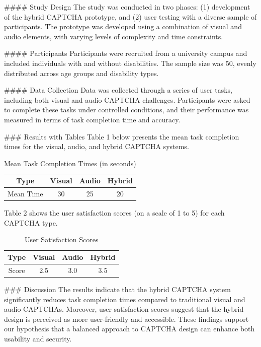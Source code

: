 #### Study Design
The study was conducted in two phases: (1) development of the hybrid CAPTCHA prototype, and (2) user testing with a diverse sample of participants. The prototype was developed using a combination of visual and audio elements, with varying levels of complexity and time constraints.

#### Participants
Participants were recruited from a university campus and included individuals with and without disabilities. The sample size was 50, evenly distributed across age groups and disability types.

#### Data Collection
Data was collected through a series of user tasks, including both visual and audio CAPTCHA challenges. Participants were asked to complete these tasks under controlled conditions, and their performance was measured in terms of task completion time and accuracy.

### Results with Tables
Table 1 below presents the mean task completion times for the visual, audio, and hybrid CAPTCHA systems.

\begin{table}[ht]
\centering
\caption{Mean Task Completion Times (in seconds)}
\label{tab:completion_times}
\begin{tabular}{|c|c|c|c|}
\hline
\textbf{Type} & \textbf{Visual} & \textbf{Audio} & \textbf{Hybrid} \\
\hline
Mean Time & 30 & 25 & 20 \\
\hline
\end{tabular}
\end{table}

Table 2 shows the user satisfaction scores (on a scale of 1 to 5) for each CAPTCHA type.

\begin{table}[ht]
\centering
\caption{User Satisfaction Scores}
\label{tab:satisfaction_scores}
\begin{tabular}{|c|c|c|c|}
\hline
\textbf{Type} & \textbf{Visual} & \textbf{Audio} & \textbf{Hybrid} \\
\hline
Score & 2.5 & 3.0 & 3.5 \\
\hline
\end{tabular}
\end{table}

### Discussion
The results indicate that the hybrid CAPTCHA system significantly reduces task completion times compared to traditional visual and audio CAPTCHAs. Moreover, user satisfaction scores suggest that the hybrid design is perceived as more user-friendly and accessible. These findings support our hypothesis that a balanced approach to CAPTCHA design can enhance both usability and security.

